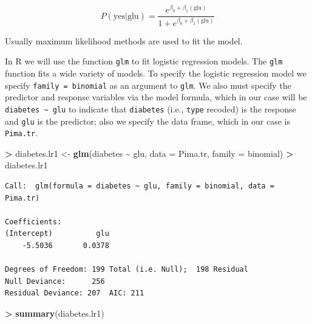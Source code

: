 \documentclass[
]{krantz}
\makeatletter
\newenvironment{Shaded}{\begin{snugshade}}{\end{snugshade}}
\newcommand{\DataTypeTok}[1]{\textcolor[rgb]{0.27,0.27,0.27}{#1}}
\newcommand{\KeywordTok}[1]{\textcolor[rgb]{0.27,0.27,0.27}{\textbf{#1}}}
\newcommand{\NormalTok}[1]{#1}
\newcommand{\OperatorTok}[1]{\textcolor[rgb]{0.43,0.43,0.43}{\textbf{#1}}}
\newcommand{\StringTok}[1]{\textcolor[rgb]{0.5,0.5,0.5}{#1}}
\newenvironment{kframe}{%
\medskip{}
\setlength{\fboxsep}{.8em}
 \def\at@end@of@kframe{}%
 \ifinner\ifhmode%
  \def\at@end@of@kframe{\end{minipage}}%
  \begin{minipage}{\columnwidth}%
 \fi\fi%
 \def\FrameCommand##1{\hskip\@totalleftmargin \hskip-\fboxsep
 \colorbox{shadecolor}{##1}\hskip-\fboxsep
     \hskip-\linewidth \hskip-\@totalleftmargin \hskip\columnwidth}%
 \MakeFramed {\advance\hsize-\width
   \@totalleftmargin\z@ \linewidth\hsize
   \@setminipage}}%
 {\par\unskip\endMakeFramed%
 \at@end@of@kframe}
\renewenvironment{Shaded}{\begin{kframe}}{\end{kframe}}
\makeatother
\begin{document}
\[
P(\text{yes} | \text{glu}) = \frac{e^{\beta_0 + \beta_1 (\text{glu})}}{1 + e^{\beta_0 + \beta_1 (\text{glu})}}
\]

Usually maximum likelihood methods are used to fit the model.

In R we will use the function \texttt{glm} to fit logistic regression models. The \texttt{glm} function fits a wide variety of models. To specify the logistic regression model we specify \texttt{family\ =\ binomial} as an argument to \texttt{glm}. We also must specify the predictor and response variables via the model formula, which in our case will be \texttt{diabetes\ \textasciitilde{}\ glu} to indicate that \texttt{diabetes} (i.e., \texttt{type} recoded) is the response and \texttt{glu} is the predictor; also we specify the data frame, which in our case is \texttt{Pima.tr}.

\begin{Shaded}
\begin{Highlighting}[]
\OperatorTok{\textgreater{}}\StringTok{ }\NormalTok{diabetes.lr1 \textless{}{-}}\StringTok{ }\KeywordTok{glm}\NormalTok{(diabetes }\OperatorTok{\textasciitilde{}}\StringTok{ }\NormalTok{glu, }\DataTypeTok{data =}\NormalTok{ Pima.tr, }\DataTypeTok{family =}\NormalTok{ binomial)}
\OperatorTok{\textgreater{}}\StringTok{ }\NormalTok{diabetes.lr1}
\end{Highlighting}
\end{Shaded}

\begin{verbatim}
Call:  glm(formula = diabetes ~ glu, family = binomial, data = Pima.tr)

Coefficients:
(Intercept)          glu  
    -5.5036       0.0378  

Degrees of Freedom: 199 Total (i.e. Null);  198 Residual
Null Deviance:      256 
Residual Deviance: 207  AIC: 211
\end{verbatim}

\begin{Shaded}
\begin{Highlighting}[]
\OperatorTok{\textgreater{}}\StringTok{ }\KeywordTok{summary}\NormalTok{(diabetes.lr1)}
\end{Highlighting}
\end{Shaded}
\end{document}
